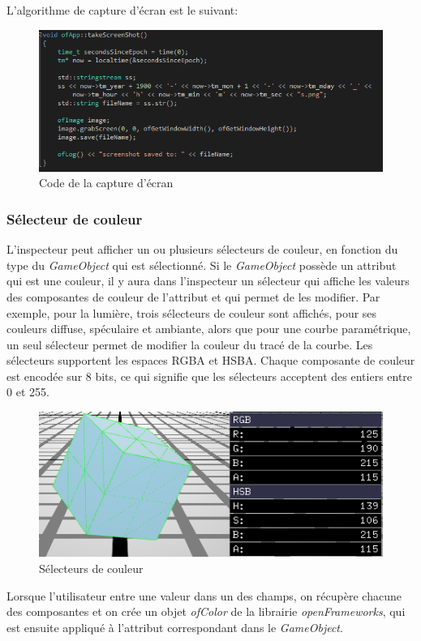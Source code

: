 L'algorithme de capture d'écran est le suivant:
\begin{figure}[H]
    \centering
	\includegraphics[scale=0.5]{fig/screenshotducodequiprenddesscreenshots.PNG}
	\caption{Code de la capture d'écran}
	\label{fig:code_capture_ecran}
\end{figure}

\subsubsection{Sélecteur de couleur}
\label{ss:selecteur_de_couleur}
L'inspecteur peut afficher un ou plusieurs sélecteurs de couleur, en fonction du type du \emph{GameObject} qui est sélectionné.
Si le \emph{GameObject} possède un attribut qui est une couleur, il y aura dans l'inspecteur un sélecteur qui affiche les valeurs des composantes de couleur de l'attribut et qui permet de les modifier.
Par exemple, pour la lumière, trois sélecteurs de couleur sont affichés, pour ses couleurs diffuse, spéculaire et ambiante, alors que pour une courbe paramétrique, un seul sélecteur permet de modifier la couleur du tracé de la courbe.
Les sélecteurs supportent les espaces RGBA et HSBA.
Chaque composante de couleur est encodée sur 8 bits, ce qui signifie que les sélecteurs acceptent des entiers entre 0 et 255.
\begin{figure}[H]
    \centering
	\includegraphics[scale=0.8]{fig/couleur.PNG}
	\caption{Sélecteurs de couleur}
	\label{fig:color_picker}
\end{figure}
Lorsque l'utilisateur entre une valeur dans un des champs, on récupère chacune des composantes et on crée un objet \emph{ofColor} de la librairie \emph{openFrameworks}, qui est ensuite appliqué à l'attribut correspondant dans le \emph{GameObject}.


